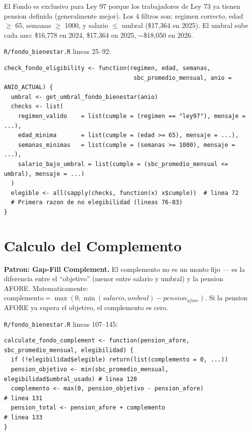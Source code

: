\documentclass[11pt, letterpaper, twoside]{report}
\begin{document}
\begin{intuicionbox}
El Fondo es exclusivo para Ley 97 porque los trabajadores de Ley 73 ya tienen
pension definida (generalmente mejor). Los 4 filtros son: regimen correcto,
edad $\geq$ 65, semanas $\geq$ 1000, y salario $\leq$ umbral (\$17,364 en 2025).
El umbral sube cada ano: \$16,778 en 2024, \$17,364 en 2025, $\sim$\$18,050 en 2026.
\end{intuicionbox}

\begin{codigobox}
\texttt{R/fondo\_bienestar.R} lineas 25--92:
\begin{lstlisting}[caption={Checklist de elegibilidad del Fondo}]
check_fondo_eligibility <- function(regimen, edad, semanas,
                                     sbc_promedio_mensual, anio = ANIO_ACTUAL) {
  umbral <- get_umbral_fondo_bienestar(anio)
  checks <- list(
    regimen_valido    = list(cumple = (regimen == "ley97"), mensaje = ...),
    edad_minima       = list(cumple = (edad >= 65), mensaje = ...),
    semanas_minimas   = list(cumple = (semanas >= 1000), mensaje = ...),
    salario_bajo_umbral = list(cumple = (sbc_promedio_mensual <= umbral), mensaje = ...)
  )
  elegible <- all(sapply(checks, function(x) x$cumple))  # linea 72
  # Primera razon de no elegibilidad (lineas 76-83)
}
\end{lstlisting}
\end{codigobox}


\section{Calculo del Complemento}

\begin{patronbox}
\textbf{Patron: Gap-Fill Complement.} El complemento no es un monto fijo --- es la
diferencia entre el ``objetivo'' (menor entre salario y umbral) y la pension AFORE.
Matematicamente: $\text{complemento} = \max(0, \min(salario, umbral) - pension_{afore})$.
Si la pension AFORE ya supera el objetivo, el complemento es cero.
\end{patronbox}

\begin{codigobox}
\texttt{R/fondo\_bienestar.R} lineas 107--145:
\begin{lstlisting}[caption={Formula del complemento}]
calculate_fondo_complement <- function(pension_afore, sbc_promedio_mensual, elegibilidad) {
  if (!elegibilidad$elegible) return(list(complemento = 0, ...))
  pension_objetivo <- min(sbc_promedio_mensual, elegibilidad$umbral_usado) # linea 128
  complemento <- max(0, pension_objetivo - pension_afore)                  # linea 131
  pension_total <- pension_afore + complemento                             # linea 133
}
\end{lstlisting}
\end{codigobox}
\end{document}
